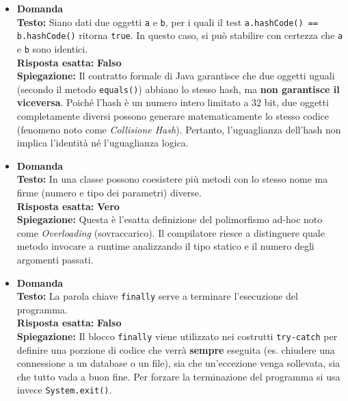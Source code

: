 \documentclass[12pt, a4paper]{article}
\begin{document}
\begin{itemize}
    \item {}\textbf{Domanda \thedomanda} \\
    \textbf{Testo:} Siano dati due oggetti \texttt{a} e \texttt{b}, per i quali il test \texttt{a.hashCode() == b.hashCode()} ritorna \texttt{true}. In questo caso, si può stabilire con certezza che \texttt{a} e \texttt{b} sono identici. \\
    \textbf{Risposta esatta:} \textbf{Falso} \\
    \textbf{Spiegazione:} Il contratto formale di Java garantisce che due oggetti uguali (secondo il metodo \texttt{equals()}) abbiano lo stesso hash, ma \textbf{non garantisce il viceversa}. Poiché l'hash è un numero intero limitato a 32 bit, due oggetti completamente diversi possono generare matematicamente lo stesso codice (fenomeno noto come \textit{Collisione Hash}). Pertanto, l'uguaglianza dell'hash non implica l'identità né l'uguaglianza logica.
    \vspace{0.3cm}

    \item {}\textbf{Domanda \thedomanda} \\
    \textbf{Testo:} In una classe possono coesistere più metodi con lo stesso nome ma firme (numero e tipo dei parametri) diverse. \\
    \textbf{Risposta esatta:} \textbf{Vero} \\
    \textbf{Spiegazione:} Questa è l'esatta definizione del polimorfismo ad-hoc noto come \textit{Overloading} (sovraccarico). Il compilatore riesce a distinguere quale metodo invocare a runtime analizzando il tipo statico e il numero degli argomenti passati.
    \vspace{0.3cm}

    \item {}\textbf{Domanda \thedomanda} \\
    \textbf{Testo:} La parola chiave \texttt{finally} serve a terminare l'esecuzione del programma. \\
    \textbf{Risposta esatta:} \textbf{Falso} \\
    \textbf{Spiegazione:} Il blocco \texttt{finally} viene utilizzato nei costrutti \texttt{try-catch} per definire una porzione di codice che verrà \textbf{sempre} eseguita (es. chiudere una connessione a un database o un file), sia che un'eccezione venga sollevata, sia che tutto vada a buon fine. Per forzare la terminazione del programma si usa invece \texttt{System.exit()}.
    \vspace{0.3cm}


\end{itemize}
\end{document}
